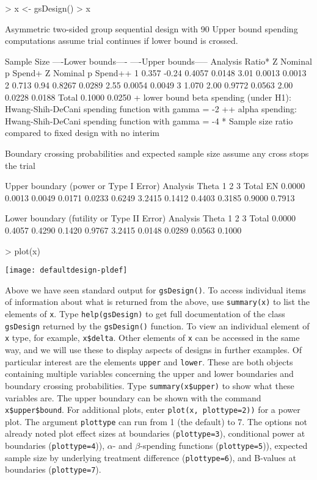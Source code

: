 \begin{Schunk}
\begin{Sinput}
> x <- gsDesign()
> x
\end{Sinput}
\begin{Soutput}
Asymmetric two-sided group sequential design with
90 % power and 2.5 % Type I Error.
Upper bound spending computations assume
trial continues if lower bound is crossed.

           Sample
            Size    ----Lower bounds----  ----Upper bounds-----
  Analysis Ratio*   Z   Nominal p Spend+  Z   Nominal p Spend++
         1  0.357 -0.24    0.4057 0.0148 3.01    0.0013  0.0013
         2  0.713  0.94    0.8267 0.0289 2.55    0.0054  0.0049
         3  1.070  2.00    0.9772 0.0563 2.00    0.0228  0.0188
     Total                        0.1000                 0.0250 
+ lower bound beta spending (under H1):
 Hwang-Shih-DeCani spending function with gamma = -2
++ alpha spending:
 Hwang-Shih-DeCani spending function with gamma = -4
* Sample size ratio compared to fixed design with no interim

Boundary crossing probabilities and expected sample size
assume any cross stops the trial

Upper boundary (power or Type I Error)
          Analysis
   Theta      1      2      3  Total   E{N}
  0.0000 0.0013 0.0049 0.0171 0.0233 0.6249
  3.2415 0.1412 0.4403 0.3185 0.9000 0.7913

Lower boundary (futility or Type II Error)
          Analysis
   Theta      1      2      3  Total
  0.0000 0.4057 0.4290 0.1420 0.9767
  3.2415 0.0148 0.0289 0.0563 0.1000
\end{Soutput}
\begin{Sinput}
> plot(x)
\end{Sinput}
\end{Schunk}
\texttt{[image: defaultdesign-pldef]}

Above we have seen standard output for \texttt{gsDesign()}. 
To access individual items of information about what is returned from the above, use \texttt{summary(x)} to list the elements of \texttt{x}.
Type \texttt{help(gsDesign)} to get full documentation of the class \texttt{gsDesign} returned by the \texttt{gsDesign()} function. 
To view an individual element of \texttt{x} type, for example, \texttt{x\$delta}. 
Other elements of \texttt{x} can be accessed in the same way, and we will use these to display aspects of designs in further examples. 
Of particular interest are the elements \texttt{upper} and \texttt{lower}. 
These are both objects containing multiple variables concerning the upper and lower boundaries and boundary crossing probabilities.
Type \texttt{summary(x\$upper)} to show what these variables are. 
The upper boundary can be shown with the command \texttt{x\$upper\$bound}.
For additional plots, enter \texttt{plot(x, plottype=2))} for a power plot.
The argument \texttt{plottype} can run from 1 (the default) to 7.
The options not already noted plot effect sizes at boundaries (\texttt{plottype=3}), conditional power at boundaries (\texttt{plottype=4})), 
$\alpha$- and $\beta$-spending functions (\texttt{plottype=5})), expected sample size by underlying treatment difference (\texttt{plottype=6}), and B-values at boundaries (\texttt{plottype=7}).

